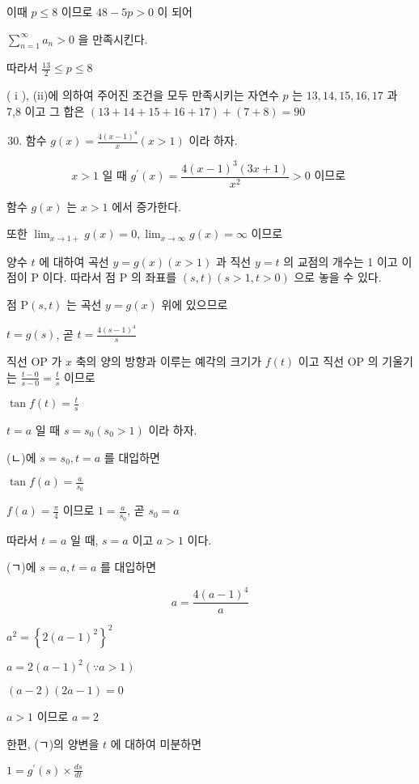 \documentclass[10pt]{article}
\begin{document}
이때 $p \leq 8$ 이므로 $48-5 p>0$ 이 되어

$\sum_{n=1}^{\infty} a_{n}>0$ 을 만족시킨다.

따라서 $\frac{13}{2} \leq p \leq 8$

( i ), (ii)에 의하여 주어진 조건을 모두 만족시키는 자연수 $p$ 는 $13,14,15,16,17$ 과 7,8 이고 그 합은 $(13+14+15+16+17)+(7+8)=90$

\begin{enumerate}
  \setcounter{enumi}{29}
  \item 함수 $g(x)=\frac{4(x-1)^{4}}{x}(x>1)$ 이라 하자.
\end{enumerate}

\[
x>1 \text { 일 때 } g^{\prime}(x)=\frac{4(x-1)^{3}(3 x+1)}{x^{2}}>0 \text { 이므로 }
\]

함수 $g(x)$ 는 $x>1$ 에서 증가한다.

또한 $\lim _{x \rightarrow 1+} g(x)=0, \lim _{x \rightarrow \infty} g(x)=\infty$ 이므로

양수 $t$ 에 대하여 곡선 $y=g(x)(x>1)$ 과 직선 $y=t$ 의 교점의 개수는 1 이고 이 점이 P 이다. 따라서 점 P 의 좌표를 $(s, t)(s>1, t>0)$ 으로 놓을 수 있다.

점 $\mathrm{P}(s, t)$ 는 곡선 $y=g(x)$ 위에 있으므로

$t=g(s)$, 곧 $t=\frac{4(s-1)^{4}}{s}$

직선 OP 가 $x$ 축의 양의 방향과 이루는 예각의 크기가 $f(t)$ 이고 직선 OP 의 기울기는 $\frac{t-0}{s-0}=\frac{t}{s}$ 이므로

$\tan f(t)=\frac{t}{s}$

$t=a$ 일 때 $s=s_{0}\left(s_{0}>1\right)$ 이라 하자.

(ㄴ)에 $s=s_{0}, t=a$ 를 대입하면

$\tan f(a)=\frac{a}{s_{0}}$

$f(a)=\frac{\pi}{4}$ 이므로 $1=\frac{a}{s_{0}}$, 곧 $s_{0}=a$

따라서 $t=a$ 일 때, $s=a$ 이고 $a>1$ 이다.

(ㄱ)에 $s=a, t=a$ 를 대입하면

\[
a=\frac{4(a-1)^{4}}{a}
\]

$a^{2}=\left\{2(a-1)^{2}\right\}^{2}$

$a=2(a-1)^{2}(\because a>1)$

$(a-2)(2 a-1)=0$

$a>1$ 이므로 $a=2$

한편, (ㄱ)의 양변을 $t$ 에 대하여 미분하면

$1=g^{\prime}(s) \times \frac{d s}{d t}$
\end{document}

